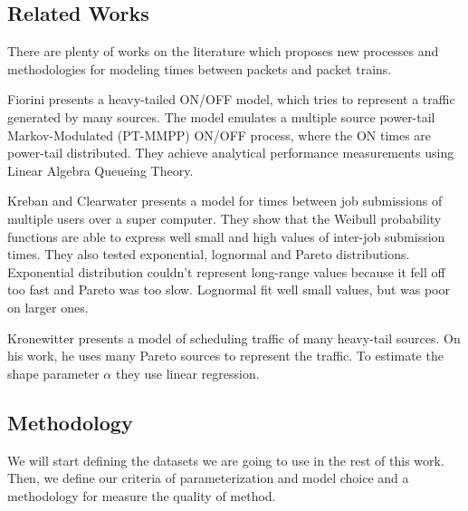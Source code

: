 \subsection{Related Works}

There are plenty of works on the literature which proposes new processes and methodologies for modeling times between packets and packet trains.

Fiorini \cite{modeling-concurrent-heavy-tailed} presents a heavy-tailed ON/OFF model, which tries to represent a traffic generated by many sources. The model emulates a multiple source power-tail Markov-Modulated (PT-MMPP) ON/OFF process, where the ON times are power-tail distributed. They achieve analytical performance measurements using Linear Algebra Queueing Theory.

Kreban and Clearwater\cite{hierarchical-dynamics-interarrival-times} presents a model for times between job submissions of multiple users over a super computer. They show that the Weibull probability functions are able to express well small and high values of inter-job submission times. They also tested exponential, lognormal and Pareto distributions. Exponential distribution couldn't  represent long-range values because it fell off too fast and Pareto was too slow. Lognormal fit well small values, but was poor on larger ones.    

Kronewitter\cite{optimal-scheduling-of-heavy-tailed-traffic} presents a model of scheduling traffic of many heavy-tail sources. On his work, he uses many Pareto sources to represent the traffic. To estimate the shape parameter $\alpha$ they use linear regression.





\subsection{Methodology}

We will start defining the datasets we are going to use in the rest of this work. Then, we define our criteria of parameterization and model choice and a methodology for measure the quality of method. 



